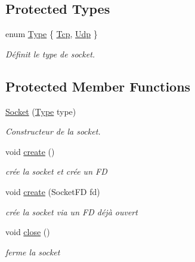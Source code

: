 \subsection*{Protected Types}
\begin{DoxyCompactItemize}
\item 
enum \hyperlink{classmognetwork_1_1_socket_a70fb1fd697cfe89987e81bbe9db8ea4d}{Type} \{ \hyperlink{classmognetwork_1_1_socket_a70fb1fd697cfe89987e81bbe9db8ea4dad6adab633c51e7fd9780763f821bea67}{Tcp}, 
\hyperlink{classmognetwork_1_1_socket_a70fb1fd697cfe89987e81bbe9db8ea4dac91debddee39f30455177839f94bdde6}{Udp}
 \}
\begin{DoxyCompactList}\small\item\em Définit le type de socket. \end{DoxyCompactList}\end{DoxyCompactItemize}
\subsection*{Protected Member Functions}
\begin{DoxyCompactItemize}
\item 
\hyperlink{classmognetwork_1_1_socket_a27ed1b1c76de76da577ccbf5b0b687ef}{Socket} (\hyperlink{classmognetwork_1_1_socket_a70fb1fd697cfe89987e81bbe9db8ea4d}{Type} type)
\begin{DoxyCompactList}\small\item\em Constructeur de la socket. \end{DoxyCompactList}\item 
\hypertarget{classmognetwork_1_1_socket_a442e315822bc0fbeeb7c5669a0dceacc}{void \hyperlink{classmognetwork_1_1_socket_a442e315822bc0fbeeb7c5669a0dceacc}{create} ()}\label{classmognetwork_1_1_socket_a442e315822bc0fbeeb7c5669a0dceacc}

\begin{DoxyCompactList}\small\item\em crée la socket et crée un F\-D \end{DoxyCompactList}\item 
\hypertarget{classmognetwork_1_1_socket_a60e3f8b01b89ba0ce03c24ac92e4be0d}{void \hyperlink{classmognetwork_1_1_socket_a60e3f8b01b89ba0ce03c24ac92e4be0d}{create} (Socket\-F\-D fd)}\label{classmognetwork_1_1_socket_a60e3f8b01b89ba0ce03c24ac92e4be0d}

\begin{DoxyCompactList}\small\item\em crée la socket via un F\-D déjà ouvert \end{DoxyCompactList}\item 
\hypertarget{classmognetwork_1_1_socket_a7e8f6bc7f729be6cf1d8c1d5dd638a0b}{void \hyperlink{classmognetwork_1_1_socket_a7e8f6bc7f729be6cf1d8c1d5dd638a0b}{close} ()}\label{classmognetwork_1_1_socket_a7e8f6bc7f729be6cf1d8c1d5dd638a0b}

\begin{DoxyCompactList}\small\item\em ferme la socket \end{DoxyCompactList}\end{DoxyCompactItemize}


